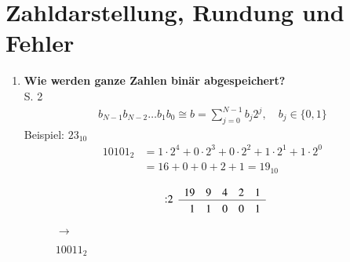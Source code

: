 \section{Zahldarstellung, Rundung und Fehler}
	\begin{enumerate}
		\item \textbf{Wie werden ganze Zahlen binär abgespeichert?}\\
			S. 2
			\begin{align*}
				b_{N-1}b_{N-2}\dots b_{1}b_{0} \cong b = \sum_{j=0}^{N-1}b_j2^j, \quad b_j\in\{0,1\}
			\end{align*}
			Beispiel: $23_{10}$
			\begin{align*}
					10101_2 &= 1\cdot2^4+0\cdot2^3+0\cdot2^2+1\cdot2^1+1\cdot2^0 \\
					      &= 16+0+0+2+1 = 19_{10}
			\end{align*} \vspace{-1cm}
			\begin{figure}[htbp]
				\centering
				\begin{minipage}{0.3\textwidth}
					\centering
					$$\begin{array}{rrrrrr}
					\multirow{2}{*}{:2} & 19 & 9 & 4 & 2 & 1 \\
					\cline{2-6}
					 \rule{0pt}{2.5ex} & 1 &  1 & 0 & 0 & 1
					\end{array}$$
				\end{minipage}\hspace{-0.5cm}
				\begin{minipage}{0.01\textwidth}
					\centering
					$\rightarrow$
				\end{minipage}\hspace{-0.7cm}
				\begin{minipage}{0.2\textwidth}
					\centering
					$10011_2$
				\end{minipage}
			\end{figure}
			

\end{enumerate}
